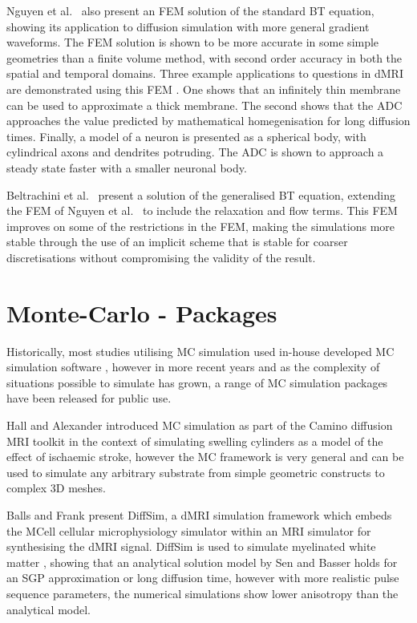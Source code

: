 Nguyen et al.\ \cite{Nguyen2014} also present an \ac{FEM} solution of the standard \ac{BT} equation, showing its application to diffusion simulation with more general gradient waveforms.
The \ac{FEM} solution is shown to be more accurate in some simple geometries than a finite volume method, with second order accuracy in both the spatial and temporal domains.
Three example applications to questions in \ac{dMRI} are demonstrated using this \ac{FEM}
\cite{Nguyen2014}.
One shows that an infinitely thin membrane can be used to approximate a thick membrane. The second shows that the \ac{ADC} approaches the value predicted by mathematical homegenisation for long diffusion times. Finally, a model of a neuron is presented as a spherical body, with cylindrical axons and dendrites potruding. The \ac{ADC} is shown to approach a steady state faster with a smaller neuronal body.

Beltrachini et al.\ \cite{Beltrachini2016} present a solution of the generalised \ac{BT} equation, extending the \ac{FEM} of Nguyen et al.\ \cite{Nguyen2014} to include the relaxation and flow terms. This \ac{FEM} improves on some of the restrictions in the \ac{FEM}, making the simulations more stable through the use of an implicit scheme that is stable for coarser discretisations without compromising the validity of the result. 


\section{Monte-Carlo - Packages}
\label{sec:app_monte_carlo_packages}
Historically, most studies utilising \ac{MC} simulation used in-house developed \ac{MC} simulation software \cite{Lipinski1990, Szafer1995,Stanisz1997, Duh2001}, however in more recent years and as the complexity of situations possible to simulate has grown, a range of \ac{MC} simulation packages have been released for public use.

Hall and Alexander \cite{Hall2009} introduced \ac{MC} simulation as part of the Camino diffusion MRI toolkit \cite{Cook2006} in the context of simulating swelling cylinders as a model of the effect of ischaemic stroke, however the \ac{MC} framework is very general and can be used to simulate any arbitrary substrate from simple geometric constructs to complex 3D meshes. 

Balls and Frank \cite{Balls2009} present DiffSim, a dMRI simulation framework which embeds the MCell \cite{Stiles1996,Stiles2001, Kerr2008} cellular microphysiology simulator within an \ac{MRI} simulator for synthesising the \ac{dMRI} signal.
DiffSim is used to simulate myelinated white matter \cite{Baxter2013}, showing that an analytical solution model by Sen and Basser \cite{Sen2005} holds for an \ac{SGP} approximation or long diffusion time, however with more realistic pulse sequence parameters, the numerical simulations show lower anisotropy than the analytical model. 

